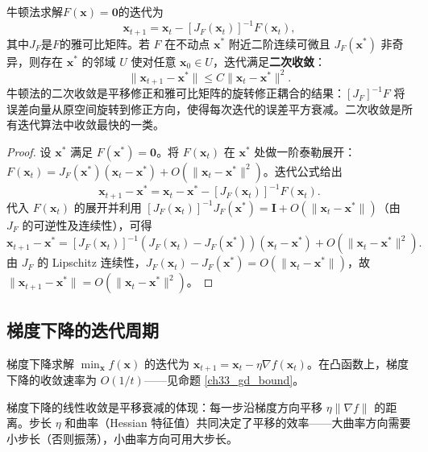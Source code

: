\begin{proposition}[牛顿法的二次收敛]\label{prop:newton_quadratic}
牛顿法求解$F(\mathbf{x}) = \mathbf{0}$的迭代为
\[
\mathbf{x}_{t+1} = \mathbf{x}_t - [J_F(\mathbf{x}_t)]^{-1} F(\mathbf{x}_t),
\]
其中$J_F$是$F$的雅可比矩阵。若 $F$ 在不动点 $\mathbf{x}^*$ 附近二阶连续可微且 $J_F(\mathbf{x}^*)$ 非奇异，则存在 $\mathbf{x}^*$ 的邻域 $U$ 使对任意 $\mathbf{x}_0 \in U$，迭代满足\textbf{二次收敛}：
\[
\|\mathbf{x}_{t+1} - \mathbf{x}^*\| \le C \|\mathbf{x}_t - \mathbf{x}^*\|^2.
\]
牛顿法的二次收敛是平移修正和雅可比矩阵的旋转修正耦合的结果：$[J_F]^{-1}F$ 将误差向量从原空间旋转到修正方向，使得每次迭代的误差平方衰减。二次收敛是所有迭代算法中收敛最快的一类。
\end{proposition}

\begin{proof}
设 $\mathbf{x}^*$ 满足 $F(\mathbf{x}^*) = \mathbf{0}$。将 $F(\mathbf{x}_t)$ 在 $\mathbf{x}^*$ 处做一阶泰勒展开：$F(\mathbf{x}_t) = J_F(\mathbf{x}^*)(\mathbf{x}_t - \mathbf{x}^*) + O(\|\mathbf{x}_t - \mathbf{x}^*\|^2)$。迭代公式给出
\[
\mathbf{x}_{t+1} - \mathbf{x}^* = \mathbf{x}_t - \mathbf{x}^* - [J_F(\mathbf{x}_t)]^{-1} F(\mathbf{x}_t).
\]
代入 $F(\mathbf{x}_t)$ 的展开并利用 $[J_F(\mathbf{x}_t)]^{-1} J_F(\mathbf{x}^*) = \mathbf{I} + O(\|\mathbf{x}_t - \mathbf{x}^*\|)$（由 $J_F$ 的可逆性及连续性），可得
\[
\mathbf{x}_{t+1} - \mathbf{x}^* = [J_F(\mathbf{x}_t)]^{-1} \left( J_F(\mathbf{x}_t) - J_F(\mathbf{x}^*) \right)(\mathbf{x}_t - \mathbf{x}^*) + O(\|\mathbf{x}_t - \mathbf{x}^*\|^2).
\]
由 $J_F$ 的 Lipschitz 连续性，$J_F(\mathbf{x}_t) - J_F(\mathbf{x}^*) = O(\|\mathbf{x}_t - \mathbf{x}^*\|)$，故 $\|\mathbf{x}_{t+1} - \mathbf{x}^*\| = O(\|\mathbf{x}_t - \mathbf{x}^*\|^2)$。
\end{proof}

\subsection{梯度下降的迭代周期}

\begin{definition}[梯度下降的收敛周期]\label{def:gd_convergence_cycle}
梯度下降求解 $\min_{\mathbf{x}} f(\mathbf{x})$ 的迭代为 $\mathbf{x}_{t+1} = \mathbf{x}_t - \eta \nabla f(\mathbf{x}_t)$。在凸函数上，梯度下降的收敛速率为 $O(1/t)$——见命题 \cref{ch33_gd_bound}。

梯度下降的线性收敛是平移衰减的体现：每一步沿梯度方向平移 $\eta \|\nabla f\|$ 的距离。步长 $\eta$ 和曲率（Hessian 特征值）共同决定了平移的效率——大曲率方向需要小步长（否则振荡），小曲率方向可用大步长。
\end{definition}

